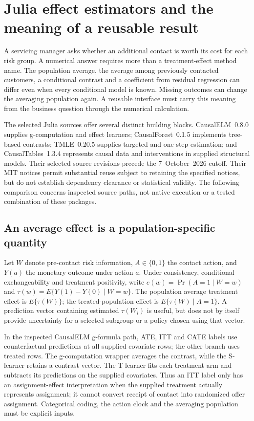 \section{Julia effect estimators and the meaning of a reusable result}
\label{exec21:effects-scope}

A servicing manager asks whether an additional contact is worth its cost for
each risk group. A numerical answer requires more than a treatment-effect
method name. The population average, the average among previously contacted
customers, a conditional contrast and a coefficient from residual regression
can differ even when every conditional model is known. Missing outcomes can
change the averaging population again. A reusable interface must carry this
meaning from the business question through the numerical calculation.

The selected Julia sources offer several distinct building blocks.
CausalELM~0.8.0 supplies g-computation and effect learners; CausalForest~0.1.5
implements tree-based contrasts; TMLE~0.20.5 supplies targeted and one-step
estimation; and CausalTables~1.3.4 represents causal data and interventions in
supplied structural models. Their selected source revisions precede the
7~October~2026 cutoff. Their MIT notices permit substantial reuse subject to
retaining the specified notices, but do not establish dependency clearance or
statistical validity. The following comparison concerns inspected source
paths, not native execution or a tested combination of these packages.
\cite{exec21_effects_causalelm,exec21_effects_causalforest,exec21_effects_tmle,exec21_effects_causaltables}

\subsection{An average effect is a population-specific quantity}
\label{exec21:effects-target}

Let $W$ denote pre-contact risk information, $A\in\{0,1\}$ the contact action,
and $Y(a)$ the monetary outcome under action $a$. Under consistency,
conditional exchangeability and treatment positivity, write
$e(w)=\Pr(A=1\mid W=w)$ and
$\tau(w)=E\{Y(1)-Y(0)\mid W=w\}$. The population average treatment effect is
$E\{\tau(W)\}$; the treated-population effect is
$E\{\tau(W)\mid A=1\}$. A prediction vector containing estimated
$\tau(W_i)$ is useful, but does not by itself provide uncertainty for a
selected subgroup or a policy chosen using that vector.

In the inspected CausalELM g-formula path, ATE, ITT and CATE labels use
counterfactual predictions at all supplied covariate rows; the other branch
uses treated rows. The g-computation wrapper averages the contrast, while the
S-learner retains a contrast vector. The T-learner fits each treatment arm and
subtracts its predictions on the supplied covariates. Thus an ITT label only
has an assignment-effect interpretation when the supplied treatment actually
represents assignment; it cannot convert receipt of contact into randomized
offer assignment. Categorical coding, the action clock and the averaging
population must be explicit inputs. \cite{exec21_effects_causalelm}

